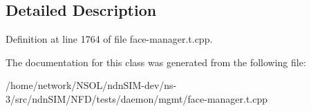 \subsection{Detailed Description}


Definition at line 1764 of file face-\/manager.\+t.\+cpp.



The documentation for this class was generated from the following file\+:\begin{DoxyCompactItemize}
\item 
/home/network/\+N\+S\+O\+L/ndn\+S\+I\+M-\/dev/ns-\/3/src/ndn\+S\+I\+M/\+N\+F\+D/tests/daemon/mgmt/face-\/manager.\+t.\+cpp\end{DoxyCompactItemize}
